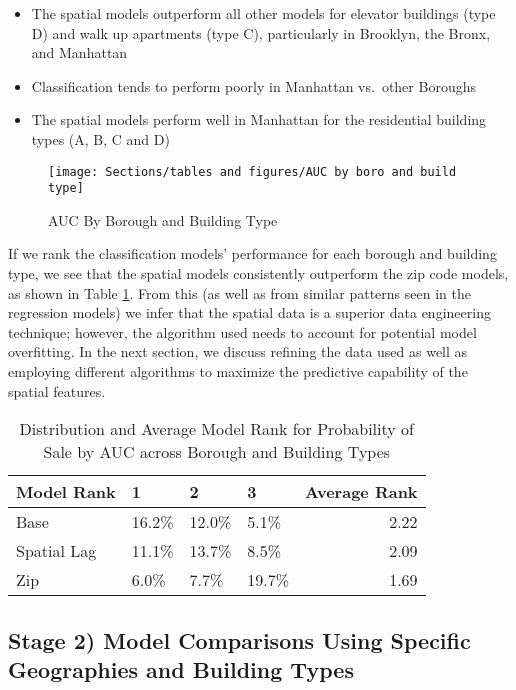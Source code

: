 \documentclass[12pt,]{article}
\providecommand{\tightlist}{%
  \setlength{\itemsep}{0pt}\setlength{\parskip}{0pt}}
\begin{document}
\begin{itemize}
\tightlist
\item
  The spatial models outperform all other models for elevator buildings
  (type D) and walk up apartments (type C), particularly in Brooklyn,
  the Bronx, and Manhattan
\item
  Classification tends to perform poorly in Manhattan vs.~other Boroughs
\item
  The spatial models perform well in Manhattan for the residential
  building types (A, B, C and D)
\end{itemize}

\begin{figure}[H]
\texttt{[image: Sections/tables and figures/AUC by boro and build type]} \caption{AUC By Borough and Building Type}\label{fig:AUC by boro and build type}
\end{figure}

If we rank the classification models' performance for each borough and
building type, we see that the spatial models consistently outperform
the zip code models, as shown in Table \ref{tab:ProbModelAUCRank}. From
this (as well as from similar patterns seen in the regression models) we
infer that the spatial data is a superior data engineering technique;
however, the algorithm used needs to account for potential model
overfitting. In the next section, we discuss refining the data used as
well as employing different algorithms to maximize the predictive
capability of the spatial features.

\begin{table}

\caption{\label{tab:Prob Model AUC Average Rank}\label{tab:ProbModelAUCRank} Distribution and Average Model Rank for Probability of Sale by AUC across Borough and Building Types}
\centering
\begin{tabular}[t]{llllr}
\toprule
Model Rank & 1 & 2 & 3 & Average Rank\\
\midrule
Base & 16.2\% & 12.0\% & 5.1\% & 2.22\\
Spatial Lag & 11.1\% & 13.7\% & 8.5\% & 2.09\\
Zip & 6.0\% & 7.7\% & 19.7\% & 1.69\\
\bottomrule
\end{tabular}
\end{table}

\hypertarget{stage-2-model-comparisons-using-specific-geographies-and-building-types}{%
\subsection{Stage 2) Model Comparisons Using Specific Geographies and
Building
Types}\label{stage-2-model-comparisons-using-specific-geographies-and-building-types}}
\end{document}
